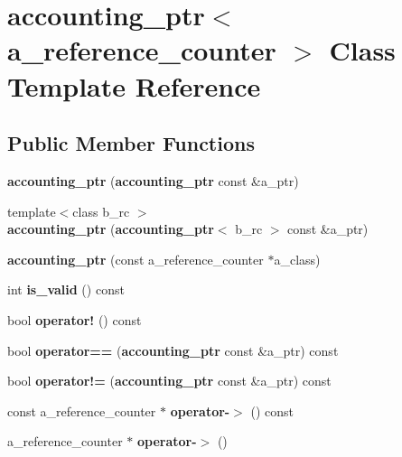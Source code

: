 \section{accounting\-\_\-ptr$<$ a\-\_\-reference\-\_\-counter $>$ Class Template Reference}
\label{classaccounting__ptr}
\subsection*{Public Member Functions}
\begin{DoxyCompactItemize}
\item 
{\bfseries accounting\-\_\-ptr} ({\bf accounting\-\_\-ptr} const \&a\-\_\-ptr)\label{classaccounting__ptr_a8141d21190a97a20d7abfd6e63ba1161}

\item 
{\footnotesize template$<$class b\-\_\-rc $>$ }\\{\bfseries accounting\-\_\-ptr} ({\bf accounting\-\_\-ptr}$<$ b\-\_\-rc $>$ const \&a\-\_\-ptr)\label{classaccounting__ptr_a56a7f088d677bae45034112481d86357}

\item 
{\bfseries accounting\-\_\-ptr} (const a\-\_\-reference\-\_\-counter $\ast$a\-\_\-class)\label{classaccounting__ptr_a59f3770315b62534e93ada26a41ed192}

\item 
int {\bfseries is\-\_\-valid} () const \label{classaccounting__ptr_a714b2b2bcade1d6ee91d75aee7c67b24}

\item 
bool {\bfseries operator!} () const \label{classaccounting__ptr_a9d354fe76b1aa68b5abb2ae025049ea1}

\item 
bool {\bfseries operator==} ({\bf accounting\-\_\-ptr} const \&a\-\_\-ptr) const \label{classaccounting__ptr_aafb6b0ac4548c045ee3d7f6d2fc2ee15}

\item 
bool {\bfseries operator!=} ({\bf accounting\-\_\-ptr} const \&a\-\_\-ptr) const \label{classaccounting__ptr_aea136ea90a95e3a53aa3f545693cacad}

\item 
const a\-\_\-reference\-\_\-counter $\ast$ {\bfseries operator-\/$>$} () const \label{classaccounting__ptr_acc0f2124d873c147516af5d0379e12ba}

\item 
a\-\_\-reference\-\_\-counter $\ast$ {\bfseries operator-\/$>$} ()\label{classaccounting__ptr_afc228c301e6210960ff4cedc67090fd5}


\end{DoxyCompactItemize}

